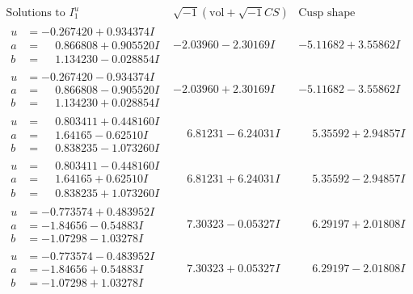 \documentclass[1p]{elsarticle_modified}
\theoremstyle{definition}
\newcommand{\I}{\sqrt{-1}}
\begin{document}
$$\begin{array}{c|c|c}  
\text{Solutions to }I^u_{1}& \I (\text{vol} + \sqrt{-1}CS) & \text{Cusp shape}\\
 \hline 
\begin{aligned}
u &= -0.267420 + 0.934374 I \\
a &= \phantom{-}0.866808 + 0.905520 I \\
b &= \phantom{-}1.134230 - 0.028854 I\end{aligned}
 & -2.03960 - 2.30169 I & -5.11682 + 3.55862 I \\ \hline\begin{aligned}
u &= -0.267420 - 0.934374 I \\
a &= \phantom{-}0.866808 - 0.905520 I \\
b &= \phantom{-}1.134230 + 0.028854 I\end{aligned}
 & -2.03960 + 2.30169 I & -5.11682 - 3.55862 I \\ \hline\begin{aligned}
u &= \phantom{-}0.803411 + 0.448160 I \\
a &= \phantom{-}1.64165 - 0.62510 I \\
b &= \phantom{-}0.838235 - 1.073260 I\end{aligned}
 & \phantom{-}6.81231 - 6.24031 I & \phantom{-}5.35592 + 2.94857 I \\ \hline\begin{aligned}
u &= \phantom{-}0.803411 - 0.448160 I \\
a &= \phantom{-}1.64165 + 0.62510 I \\
b &= \phantom{-}0.838235 + 1.073260 I\end{aligned}
 & \phantom{-}6.81231 + 6.24031 I & \phantom{-}5.35592 - 2.94857 I \\ \hline\begin{aligned}
u &= -0.773574 + 0.483952 I \\
a &= -1.84656 - 0.54883 I \\
b &= -1.07298 - 1.03278 I\end{aligned}
 & \phantom{-}7.30323 - 0.05327 I & \phantom{-}6.29197 + 2.01808 I \\ \hline\begin{aligned}
u &= -0.773574 - 0.483952 I \\
a &= -1.84656 + 0.54883 I \\
b &= -1.07298 + 1.03278 I\end{aligned}
 & \phantom{-}7.30323 + 0.05327 I & \phantom{-}6.29197 - 2.01808 I \\ \hline\begin{aligned}

\end{aligned}
\end{array}$$
\end{document}
